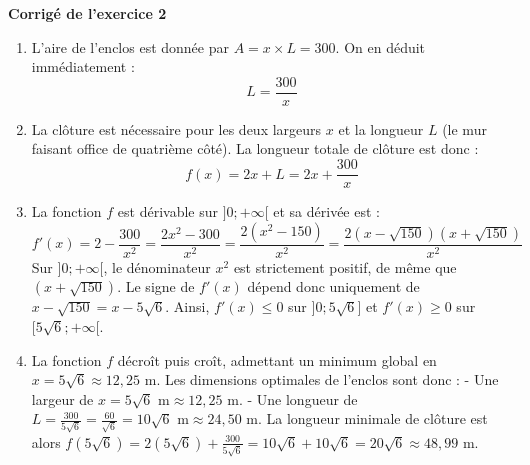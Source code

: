 \documentclass[11pt,a4paper]{article}
\begin{document}
\vspace{0.5em}
\noindent\textbf{Corrigé de l'exercice 2}

\begin{enumerate}
  \item L'aire de l'enclos est donnée par $A = x \times L = 300$. On en déduit immédiatement :
  $$L = \frac{300}{x}$$
  \item La clôture est nécessaire pour les deux largeurs $x$ et la longueur $L$ (le mur faisant office de quatrième côté). La longueur totale de clôture est donc :
  $$f(x) = 2x + L = 2x + \frac{300}{x}$$
  \item La fonction $f$ est dérivable sur $]0 ; +\infty[$ et sa dérivée est :
  $$f'(x) = 2 - \frac{300}{x^2} = \frac{2x^2 - 300}{x^2} = \frac{2(x^2 - 150)}{x^2} = \frac{2(x - \sqrt{150})(x + \sqrt{150})}{x^2}$$
  Sur $]0 ; +\infty[$, le dénominateur $x^2$ est strictement positif, de même que $(x + \sqrt{150})$. Le signe de $f'(x)$ dépend donc uniquement de $x - \sqrt{150} = x - 5\sqrt{6}$.
  Ainsi, $f'(x) \le 0$ sur $]0 ; 5\sqrt{6}]$ et $f'(x) \ge 0$ sur $[5\sqrt{6} ; +\infty[$.
  \item La fonction $f$ décroît puis croît, admettant un minimum global en $x = 5\sqrt{6} \approx 12,25\text{ m}$.
  Les dimensions optimales de l'enclos sont donc :
  - Une largeur de $x = 5\sqrt{6}\text{ m} \approx 12,25\text{ m}$.
  - Une longueur de $L = \frac{300}{5\sqrt{6}} = \frac{60}{\sqrt{6}} = 10\sqrt{6}\text{ m} \approx 24,50\text{ m}$.
  La longueur minimale de clôture est alors $f(5\sqrt{6}) = 2(5\sqrt{6}) + \frac{300}{5\sqrt{6}} = 10\sqrt{6} + 10\sqrt{6} = 20\sqrt{6} \approx 48,99\text{ m}$.
\end{enumerate}
\end{document}
